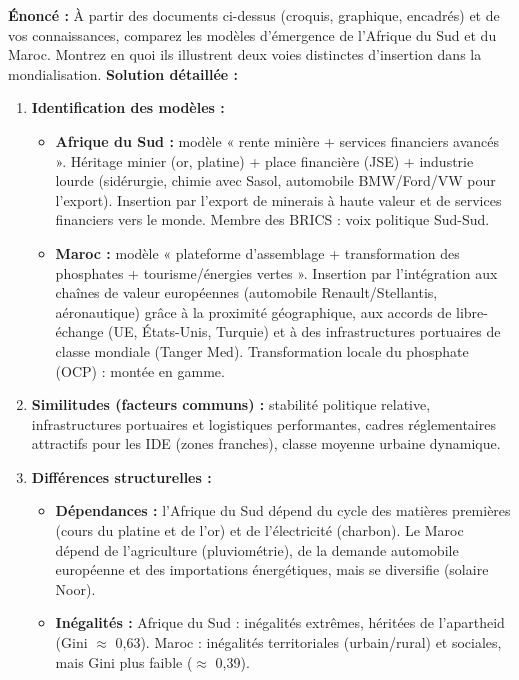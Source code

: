 \documentclass[11pt]{article}
\begin{document}
\begin{exoresolu}
\textbf{Énoncé :} À partir des documents ci-dessus (croquis, graphique, encadrés) et de vos connaissances, comparez les modèles d'émergence de l'Afrique du Sud et du Maroc. Montrez en quoi ils illustrent deux voies distinctes d'insertion dans la mondialisation.
\tcblower
\textbf{Solution détaillée :}
\begin{enumerate}
    \item \textbf{Identification des modèles :}
    \begin{itemize}
        \item \textbf{Afrique du Sud :} modèle « rente minière + services financiers avancés ». Héritage minier (or, platine) + place financière (JSE) + industrie lourde (sidérurgie, chimie avec Sasol, automobile BMW/Ford/VW pour l'export). Insertion par l'export de minerais à haute valeur et de services financiers vers le monde. Membre des BRICS : voix politique Sud-Sud.
        \item \textbf{Maroc :} modèle « plateforme d'assemblage + transformation des phosphates + tourisme/énergies vertes ». Insertion par l'intégration aux chaînes de valeur européennes (automobile Renault/Stellantis, aéronautique) grâce à la proximité géographique, aux accords de libre-échange (UE, États-Unis, Turquie) et à des infrastructures portuaires de classe mondiale (Tanger Med). Transformation locale du phosphate (OCP) : montée en gamme.
    \end{itemize}
    \item \textbf{Similitudes (facteurs communs) :} stabilité politique relative, infrastructures portuaires et logistiques performantes, cadres réglementaires attractifs pour les IDE (zones franches), classe moyenne urbaine dynamique.
    \item \textbf{Différences structurelles :}
    \begin{itemize}
        \item \textbf{Dépendances :} l'Afrique du Sud dépend du cycle des matières premières (cours du platine et de l'or) et de l'électricité (charbon). Le Maroc dépend de l'agriculture (pluviométrie), de la demande automobile européenne et des importations énergétiques, mais se diversifie (solaire Noor).
        \item \textbf{Inégalités :} Afrique du Sud : inégalités extrêmes, héritées de l'apartheid (Gini $\approx$ 0,63). Maroc : inégalités territoriales (urbain/rural) et sociales, mais Gini plus faible ($\approx$ 0,39).

\end{itemize}
\end{enumerate}
\end{exoresolu}
\end{document}
